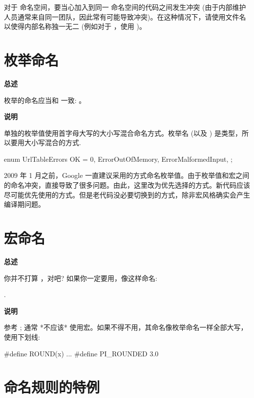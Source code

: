 对于  命名空间，要当心加入到同一  命名空间的代码之间发生冲突 (由于内部维护人员通常来自同一团队，因此常有可能导致冲突)。在这种情况下，请使用文件名以使得内部名称独一无二 (例如对于 ，使用 )。

\section{枚举命名}

\textbf{总述}

枚举的命名应当和  一致:  。

\textbf{说明}

单独的枚举值使用首字母大写的大小写混合命名方式。枚举名  (以及 ) 是类型，所以要用大小写混合的方式.

\begin{cppcode}
  enum UrlTableErrors {
      OK = 0,
      ErrorOutOfMemory,
      ErrorMalformedInput,
    };
\end{cppcode}

2009 年 1 月之前，Google 一直建议采用的方式命名枚举值。由于枚举值和宏之间的命名冲突，直接导致了很多问题。由此，这里改为优先选择的方式。新代码应该尽可能优先使用的方式。但是老代码没必要切换到的方式，除非宏风格确实会产生编译期问题。

\section{宏命名} \label{macro-names}

\textbf{总述}

你并不打算 ，对吧? 如果你一定要用，像这样命名:

.

\textbf{说明}

参考 ; 通常 *不应该* 使用宏。如果不得不用，其命名像枚举命名一样全部大写，使用下划线:

\begin{cppcode}
  #define ROUND(x) ...
  #define PI_ROUNDED 3.0
\end{cppcode}

\section{命名规则的特例}

